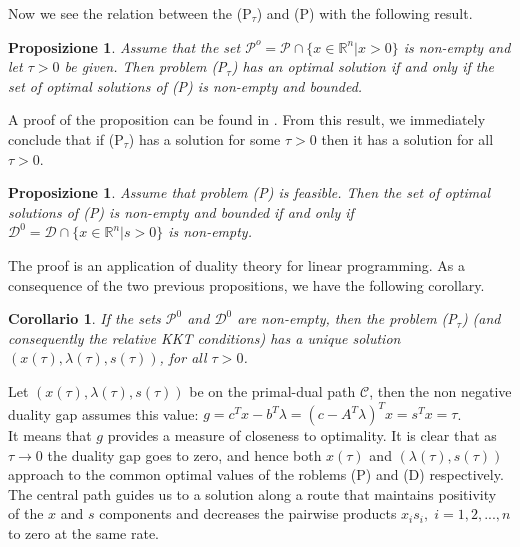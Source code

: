 \documentclass[a4paper,10 pt,titlepage,twoside]{book}
\theoremstyle{plain}
\newtheorem{cor}[thm]{Corollario}
\newtheorem{prop}[thm]{Proposizione}
\theoremstyle{definition}
\theoremstyle{remark}
\begin{document}
Now we see the relation between the (P$_{\tau}$) and (P) with the following result.
\begin{prop}
	Assume that the set $\mathcal{P}^{o} = \mathcal{P}\cap\{x\in\mathbb{R}^{n}| x> 0\}$ is non-empty and let $\tau>0$ be given. Then problem (P$_{\tau}$) has an optimal solution if and only if the set of optimal solutions of (P) is non-empty and bounded.
\end{prop}
A proof of the proposition can be found in \cite{meg}. From this result, we immediately conclude that if (P$_{\tau}$) has a solution for some $\tau>0$ then it has a solution for all $\tau>0$.
\begin{prop}
	Assume that problem (P) is feasible. Then the set of optimal solutions of (P) is non-empty and bounded if and only if $\mathcal{D}^{0} = \mathcal{D}\cap\{x\in\mathbb{R}^{n}| s> 0\}$  is non-empty.
\end{prop}
The proof is an application of duality theory for linear programming. As a consequence of the two previous propositions, we have the following corollary.
\begin{cor}
If the sets $\mathcal{P}^{0}$ and $\mathcal{D}^{0}$ are non-empty, then the problem (P$_{\tau}$) (and consequently the relative KKT conditions) has a unique solution $(x(\tau),\lambda(\tau),s(\tau))$, for all $\tau>0$. 
\end{cor}
Let $(x(\tau), \lambda(\tau), s(\tau))$ be on the primal-dual path $\mathcal{C}$, then the non negative duality gap assumes this value: $g = c^{T}x-b^{T}\lambda=\left(c-A^{T}\lambda\right)^{T}x=s^{T}x=\tau$.\\
It means that $g$ provides a measure of closeness to optimality. It is clear that as $\tau\to0$ the duality gap goes to zero, and hence both $x(\tau)$ and
 $(\lambda(\tau), s(\tau))$ approach to the common optimal values of the roblems (P) and (D) respectively. The central path guides us to a solution along a route that maintains positivity of the $x$ and $s$ components and decreases the pairwise products $x_{i}s_{i},\;i = 1,2,...,n$ to zero at the same rate.\\
 
\end{document}
